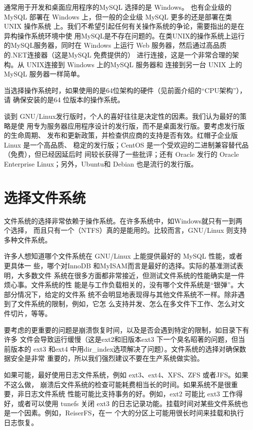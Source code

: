通常用于开发和桌面应用程序的MySQL 选择的是 Windows。 也有企业级的MySQL
部署在 Windows 上，但一般的企业级 MySQL 更多的还是部署在类UNIX 操作系统
上。我们不希望引起任何有关操作系统的争论，需要指出的是在异构操作系统环境中使
用MySQL是不存在问题的。在类UNIX的操作系统上运行的MySQL服务器，同时在
Windows 上运行 Web 服务器，然后通过高品质的.NET连接器（这是MySQL 免费提供的）
进行连接，这是一个非常合理的架构。从 UNIX连接到 Windows 上的MySQL 服务器和
连接到另一台 UNIX 上的 MySQL 服务器一样简单。

当选择操作系统时，如果使用的是64位架构的硬件（见前面介绍的“CPU架构”），请
确保安装的是64 位版本的操作系统。

谈到 GNU/Linux发行版时，个人的喜好往往是决定性的因素。我们认为最好的策略是使
用专为服务器应用程序设计的发行版，而不是桌面发行版。要考虑发行版的生命周期、
发布和更新政策，并检查供应商的支持是否有效。红帽子企业版Linux 是一个高品质、
稳定的发行版；CentOS 是一个受欢迎的二进制兼容替代品（免费），但已经因延后时
间较长获得了一些批评；还有 Oracle 发行的 Oracle Enterprise Linux；另外，Ubuntu和
Debian 也是流行的发行版。

\section{选择文件系统}
文件系统的选择非常依赖于操作系统。在许多系统中，如Windows就只有一到两个选择，
而且只有一个（NTFS）真的是能用的。比较而言，GNU/Linux 则支持多种文件系统。

许多人想知道哪个文件系统在 GNU/Linux 上能提供最好的 MySQL 性能，或者更具体一
些，哪个对InnoDB 和MyISAM而言是最好的选择。实际的基准测试表明，大多数文件
系统在很多方面都非常接近，但测试文件系统的性能确实是一件烦心事。文件系统的性
能是与工作负载相关的，没有哪个文件系统是“银弹”。大部分情况下，给定的文件系
统不会明显地表现得与其他文件系统不一样。除非遇到了文件系统的限制，例如，它怎
么支持并发、怎么在多文件下工作、怎么对文件切片，等等。

要考虑的更重要的问题是崩溃恢复时间，以及是否会遇到特定的限制，如目录下有许多
文件会导致运行缓慢（这是ext2和旧版本ext3 下一个臭名昭著的问题，但当前版本的
ext3 和ext4 中用dir\_index选项解决了问题）。文件系统的选择对确保数据安全是非常
重要的，所以我们强烈建议不要在生产系统做实验。

如果可能，最好使用日志文件系统，例如 ext3、ext4、XFS、ZFS 或者JFS。如果不这么做，
崩溃后文件系统的检查可能耗费相当长的时间。如果系统不是很重要，非日志文件系统
性能可能比支持事务的好。例如，ext2 可能比 ext3 工作得好，或者可以使用 tunefs 关闭
ext3 的日志记录功能。挂载时间对某些文件系统也是一个因素。例如，ReiserFS，在一
个大的分区上可能用很长时间来挂载和执行日志恢复。

